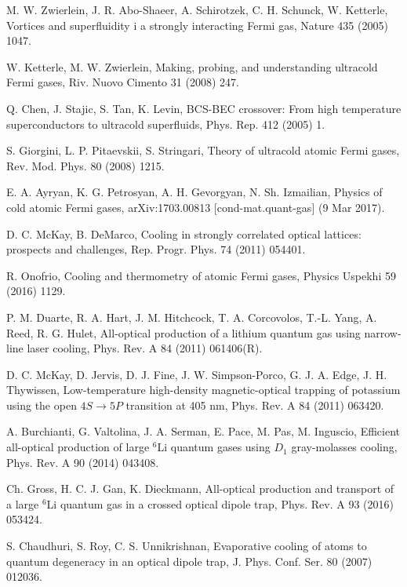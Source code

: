 \documentclass[pra,letterpaper,onecolumn,superscriptaddress,floatfix]{revtex4}
\begin{document}
\begin{thebibliography}{99}

 M. W. Zwierlein, J. R. Abo-Shaeer, A. Schirotzek, C. H. Schunck, W. Ketterle,
Vortices and superfluidity i a strongly interacting Fermi gas,
Nature 435 (2005) 1047.

 W. Ketterle, M. W. Zwierlein, 
Making, probing, and understanding ultracold Fermi gases,
Riv. Nuovo Cimento 31 (2008) 247.

 Q. Chen, J. Stajic, S. Tan, K. Levin, 
BCS-BEC crossover: From high temperature superconductors to ultracold superfluids,
Phys. Rep. 412 (2005) 1.

 S. Giorgini, L. P. Pitaevskii, S. Stringari, 
Theory of ultracold atomic Fermi gases,
Rev. Mod. Phys. 80 (2008) 1215. 

 E. A. Ayryan, K. G. Petrosyan, A. H. Gevorgyan, N. Sh. Izmailian,
Physics of cold atomic Fermi gases, arXiv:1703.00813 [cond-mat.quant-gas] (9 Mar 2017).

 D. C. McKay, B. DeMarco, 
Cooling in strongly correlated optical lattices: prospects and challenges,
Rep. Progr. Phys. 74 (2011) 054401.

 R. Onofrio,
Cooling and thermometry of atomic Fermi gases,
Physics Uspekhi 59 (2016) 1129.

 P. M. Duarte, R. A. Hart, J. M. Hitchcock, T. A. Corcovolos, T.-L. Yang, A. Reed, R. G. Hulet,
All-optical production of a lithium quantum gas using narrow-line laser cooling,
Phys. Rev. A 84 (2011) 061406(R).

 D. C. McKay, D. Jervis, D. J. Fine, J. W. Simpson-Porco, G. J. A. Edge, J. H. Thywissen,
Low-temperature high-density magnetic-optical trapping of potassium using the open $4S \rightarrow 5P$ transition at 405 nm,
Phys. Rev. A 84 (2011) 063420.

 A. Burchianti, G. Valtolina, J. A. Serman, E. Pace, M. Pas, M. Inguscio,
Efficient all-optical production of large ${}^6$Li quantum gases using $D_1$ gray-molasses cooling,
Phys. Rev. A 90 (2014) 043408.

 Ch. Gross, H. C. J. Gan, K. Dieckmann, 
All-optical production and transport of a large ${}^6$Li quantum gas in a crossed optical dipole trap,
Phys. Rev. A 93 (2016) 053424.

 S. Chaudhuri, S. Roy, C. S. Unnikrishnan, 
Evaporative cooling of atoms to quantum degeneracy in an optical dipole trap, 
J. Phys. Conf. Ser. 80 (2007) 012036.


\end{thebibliography}
\end{document}
